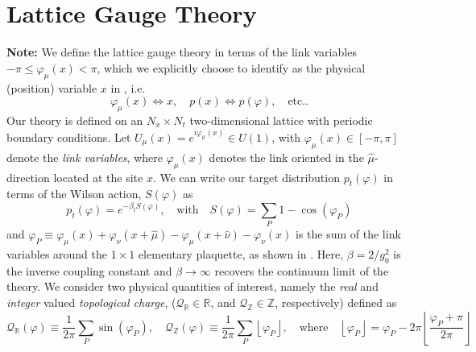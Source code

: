 \documentclass{article} %
\begin{document}
{\section{\label{sec:lattice_gauge_theory}Lattice Gauge Theory}
%
\textbf{Note:} We define the lattice gauge theory in terms of the link variables \(-\pi \leq \varphi_{\mu}(x) < \pi\),
which we explicitly choose to identify as the physical (position) variable \(x\) in , i.e.\ 
\begin{equation}
   \varphi_{\mu}(x)\Longleftrightarrow x, \quad p(x)\Longleftrightarrow p(\varphi),\quad \text{etc.}.
\end{equation}
%
Our theory is defined on an \(N_{x}\times N_{t}\) two-dimensional lattice with periodic boundary conditions.
%
Let \(U_{\mu}(x) = e^{i\varphi_{\mu}(x)} \in U(1)\), with \(\varphi_{\mu}(x) \in [-\pi,\pi]\) denote the \emph{link
variables}, where \(\varphi_{\mu}(x)\) denotes the link oriented in the \(\hat{\mu}\)-direction located at the site
\(x\).
%
%
We can write our target distribution \(p_{t}(\varphi)\) in terms of the Wilson action, \(S(\varphi)\) as
%
\begin{equation}
   p_{t}(\varphi) = e^{-\beta_{t}S(\varphi)},\quad\text{with}\quad S(\varphi) = \sum_{P}1 - \cos(\varphi_{P})
\end{equation}
%
and \(\varphi_{P} \equiv \varphi_{\mu}(x) + \varphi_{\nu}(x+\hat{\mu}) - \varphi_{\mu}(x+\hat{\nu})
-\varphi_{\nu}(x)\) is the sum of the link variables around the \(1\times1\) elementary plaquette, as shown in
\Figref{fig:plaquette}.
%
Here, \(\beta = 2 / g_{0}^{2}\) is the inverse coupling constant and \(\beta\rightarrow\infty\) recovers the continuum
limit of the theory. 
%
We consider two physical quantities of interest, namely the \emph{real} and \emph{integer} valued \emph{topological
charge}, (\(\mathcal{Q}_{\mathbb{R}} \in \mathbb{R}\), and \(\mathcal{Q}_{\mathbb{Z}}\in\mathbb{Z}\), respectively)
defined as
%
\begin{equation*}
   \mathcal{Q}_{\mathbb{R}}(\varphi) 
   \equiv \frac{1}{2\pi}\sum_{P}\sin(\varphi_{P}),\quad%
      \mathcal{Q}_{\mathbb{Z}}(\varphi) \equiv \frac{1}{2\pi}\sum_{P}\left\lfloor\varphi_{P}\right\rfloor,
   \quad\text{where}\quad \left\lfloor\varphi_{P}\right\rfloor = \varphi_{P} -
   2\pi\left\lfloor\frac{\varphi_{P}+\pi}{2\pi}\right\rfloor

\end{equation*}}
\end{document}
